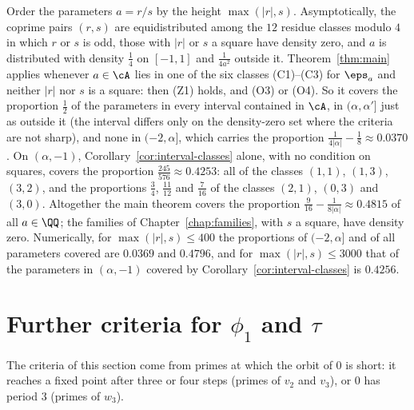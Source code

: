 \begin{remark}[Density]
  \label{rem:density}
  Order the parameters $a = r/s$ by the height $\max(|r|, s)$. Asymptotically, the coprime pairs
  $(r, s)$ are equidistributed among the $12$ residue classes modulo $4$ in which $r$ or $s$ is
  odd, those with $|r|$ or $s$ a square have density zero, and $a$ is distributed with density
  $\frac14$ on $[-1, 1]$ and $\frac{1}{4a^2}$ outside it. Theorem~\ref{thm:main} applies whenever
  $a \in \cA$ lies in one of the six classes (C1)--(C3) for $\eps_a$ and neither $|r|$ nor $s$ is a
  square: then (Z1) holds, and (O3) or (O4). So it covers the proportion $\frac12$ of the
  parameters in every interval contained in $\cA$, in $(\alpha, \alpha']$ just as outside it (the
  interval differs only on the density-zero set where the criteria are not sharp), and none in
  $(-2, \alpha]$, which carries the proportion $\frac{1}{4|\alpha|} - \frac18 \approx 0.0370$.
  On $(\alpha, -1)$, Corollary~\ref{cor:interval-classes} alone, with no condition on squares,
  covers the proportion $\frac{245}{576} \approx 0.4253$: all of the classes $(1,1)$, $(1,3)$,
  $(3,2)$, and the proportions $\frac34$, $\frac{11}{12}$ and $\frac{7}{16}$ of the classes
  $(2,1)$, $(0,3)$ and $(3,0)$. Altogether the main theorem covers the proportion
  $\frac{9}{16} - \frac{1}{8|\alpha|} \approx 0.4815$ of all $a \in \QQ$; the families of
  Chapter~\ref{chap:families}, with $s$ a square, have density zero. Numerically, for
  $\max(|r|, s) \le 400$ the proportions of $(-2, \alpha]$ and of all parameters covered are
  $0.0369$ and $0.4796$, and for $\max(|r|, s) \le 3000$ that of the parameters in $(\alpha, -1)$
  covered by Corollary~\ref{cor:interval-classes} is $0.4256$.
\end{remark}

\section{Further criteria for \texorpdfstring{$\phi_1$ and $\tau$}{phi\_1 and tau}}
\label{sec:further}

The criteria of this section come from primes at which the orbit of $0$ is short: it reaches a
fixed point after three or four steps (primes of $v_2$ and $v_3$), or $0$ has period $3$ (primes
of $w_3$).

